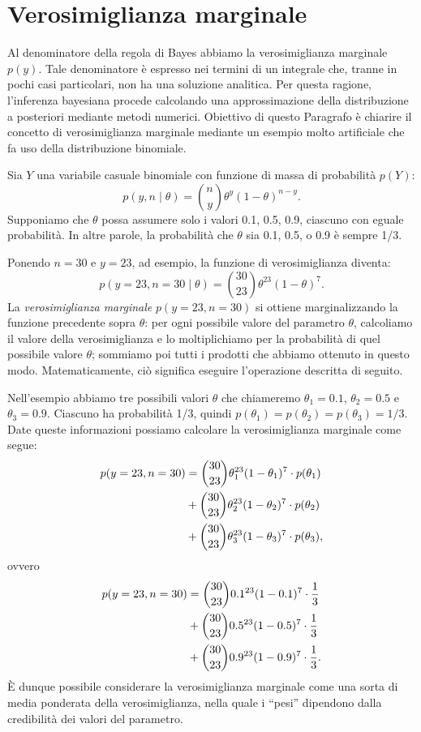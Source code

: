 \documentclass[
  11pt,
  italian,
  a4paper,
  extrafontsizes,onecolumn,openright
  ]{memoir}
\begin{document}
\hypertarget{verosim-marginale}{%
\section{Verosimiglianza marginale}\label{verosim-marginale}}

Al denominatore della regola di Bayes abbiamo la verosimiglianza marginale \(p(y)\). Tale denominatore è espresso nei termini di un integrale che, tranne in pochi casi particolari, non ha una soluzione analitica. Per questa ragione, l'inferenza bayesiana procede calcolando una approssimazione della distribuzione a posteriori mediante metodi numerici. Obiettivo di questo Paragrafo è chiarire il concetto di verosimiglianza marginale mediante un esempio molto artificiale che fa uso della distribuzione binomiale.

Sia \(Y\) una variabile casuale binomiale con funzione di massa di probabilità \(p(Y)\):
\[
p(y, n \mid \theta) = \binom{n}{y} \theta^{y} (1-\theta)^{n-y}.
\]
Supponiamo che \(\theta\) possa assumere solo i valori 0.1, 0.5, 0.9, ciascuno con eguale probabilità. In altre parole, la probabilità che \(\theta\) sia 0.1, 0.5, o 0.9 è sempre 1/3.

Ponendo \(n = 30\) e \(y = 23\), ad esempio, la funzione di verosimiglianza diventa:
\[
p(y = 23, n = 30 \mid \theta) = \binom{30}{23} \theta^{23} (1-\theta)^{7}.
\]
La \emph{verosimiglianza marginale} \(p(y = 23, n = 30)\) si ottiene marginalizzando la funzione precedente sopra \(\theta\): per ogni possibile valore del parametro \(\theta\), calcoliamo il valore della verosimiglianza e lo moltiplichiamo per la probabilità di quel possibile valore \(\theta\); sommiamo poi tutti i prodotti che abbiamo ottenuto in questo modo. Matematicamente, ciò significa eseguire l'operazione descritta di seguito.

Nell'esempio abbiamo tre possibili valori \(\theta\) che chiameremo \(\theta_1 = 0.1\), \(\theta_2 = 0.5\) e \(\theta_3 = 0.9\). Ciascuno ha probabilità 1/3, quindi \(p(\theta_1) = p(\theta_2) = p(\theta_3) = 1/3\). Date queste informazioni possiamo calcolare la verosimiglianza marginale come segue:
\begin{align}
p(y = 23, n = 30) &= \binom{30}{23} \theta_1^{23} (1-\theta_1)^{7} \cdot p(\theta_1) \notag\\
&+ \binom{30}{23} \theta_2^{23} (1-\theta_2)^{7} \cdot p(\theta_2) \notag\\
&+ \binom{30}{23} \theta_3^{23} (1-\theta_3)^{7} \cdot p(\theta_3) \notag,
\end{align}
\noindent
ovvero
\begin{align}
p(y = 23, n = 30) &= \binom{30}{23} 0.1^{23} (1-0.1)^{7} \cdot \frac{1}{3} \notag\\
&+ \binom{30}{23} 0.5^{23} (1-0.5)^{7} \cdot \frac{1}{3} \notag\\
&+ \binom{30}{23} 0.9^{23} (1-0.9)^{7} \cdot \frac{1}{3} \notag.
\end{align}
È dunque possibile considerare la verosimiglianza marginale come una sorta di media ponderata della verosimiglianza, nella quale i ``pesi'' dipendono dalla credibilità dei valori del parametro.
\end{document}
